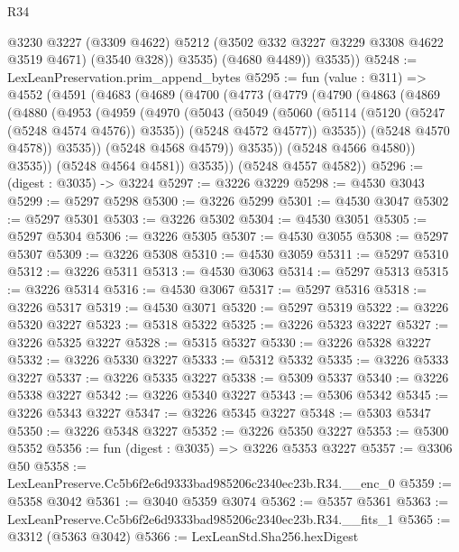 \begin{lexlean}{R34}
\begin{coremodule}
              @3230
              @3227
              (@3309 @4622)
              @5212
              (@3502 @332 @3227 @3229 @3308 @4622 @3519 @4671)
              (@3540 @328))
            @3535)
          (@4680 @4489))
        @3535))
@5248 := LexLeanPreservation.prim_append_bytes
@5295 := fun (value : @311) =>
  @4552
    (@4591
      (@4683
        (@4689
          (@4700
            (@4773
              (@4779
                (@4790
                  (@4863
                    (@4869
                      (@4880
                        (@4953
                          (@4959
                            (@4970
                              (@5043
                                (@5049
                                  (@5060
                                    (@5114 (@5120 (@5247 (@5248 @4574 @4576)) @3535))
                                    (@5248 @4572 @4577))
                                  @3535))
                              (@5248 @4570 @4578))
                            @3535))
                        (@5248 @4568 @4579))
                      @3535))
                  (@5248 @4566 @4580))
                @3535))
            (@5248 @4564 @4581))
          @3535))
      (@5248 @4557 @4582))
@5296 := (digest : @3035) -> @3224
@5297 := @3226 @3229
@5298 := @4530 @3043
@5299 := @5297 @5298
@5300 := @3226 @5299
@5301 := @4530 @3047
@5302 := @5297 @5301
@5303 := @3226 @5302
@5304 := @4530 @3051
@5305 := @5297 @5304
@5306 := @3226 @5305
@5307 := @4530 @3055
@5308 := @5297 @5307
@5309 := @3226 @5308
@5310 := @4530 @3059
@5311 := @5297 @5310
@5312 := @3226 @5311
@5313 := @4530 @3063
@5314 := @5297 @5313
@5315 := @3226 @5314
@5316 := @4530 @3067
@5317 := @5297 @5316
@5318 := @3226 @5317
@5319 := @4530 @3071
@5320 := @5297 @5319
@5322 := @3226 @5320 @3227
@5323 := @5318 @5322
@5325 := @3226 @5323 @3227
@5327 := @3226 @5325 @3227
@5328 := @5315 @5327
@5330 := @3226 @5328 @3227
@5332 := @3226 @5330 @3227
@5333 := @5312 @5332
@5335 := @3226 @5333 @3227
@5337 := @3226 @5335 @3227
@5338 := @5309 @5337
@5340 := @3226 @5338 @3227
@5342 := @3226 @5340 @3227
@5343 := @5306 @5342
@5345 := @3226 @5343 @3227
@5347 := @3226 @5345 @3227
@5348 := @5303 @5347
@5350 := @3226 @5348 @3227
@5352 := @3226 @5350 @3227
@5353 := @5300 @5352
@5356 := fun (digest : @3035) => @3226 @5353 @3227
@5357 := @3306 @50
@5358 := LexLeanPreserve.Cc5b6f2e6d9333bad985206c2340ec23b.R34.__enc_0
@5359 := @5358 @3042
@5361 := @3040 @5359 @3074
@5362 := @5357 @5361
@5363 := LexLeanPreserve.Cc5b6f2e6d9333bad985206c2340ec23b.R34.__fits_1
@5365 := @3312 (@5363 @3042)
@5366 := LexLeanStd.Sha256.hexDigest

\end{coremodule}
\end{lexlean}
